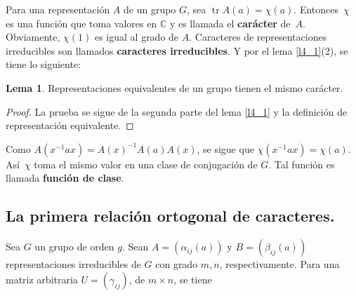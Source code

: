 \documentclass[12pt]{book}
\DeclareMathOperator{\tr}{tr}
\theoremstyle{definition}
\newtheorem{lemma}[theorem]{Lema}
\newcounter{in}
\newcounter{ini}
\begin{document}
Para una representación $A$ de un grupo $G$, sea $\tr
A(a)=\chi(a)$. Entonces~$\chi$ es una función que toma valores en
$\mathbb{C}$ y es llamada el \textbf{carácter} de~$A$. Obviamente,
$\chi(1)$ es igual al grado de $A$. Caracteres de representaciones
irreducibles son llamados \textbf{caracteres irreducibles}. Y por el
lema \ref{l4_1}(2), se tiene lo siguiente:

\begin{lemma}
  \label{l4_2}
  Representaciones equivalentes de un grupo tienen el mismo carácter.
\end{lemma}
\begin{proof}
  La prueba se sigue de la segunda parte del lema \ref{l4_1} y la
  definición de representación equivalente.
\end{proof}
Como $A(x^{-1}ax)=A(x)^{-1}A(a)A(x)$, se sigue que
$ \chi(x^{-1}ax)=\chi(a)$. Así~$\chi$ toma el mismo valor en una clase
de conjugación de $G$. Tal función es llamada \textbf{función de clase}.

\subsection{La primera relación ortogonal de caracteres.}
\label{subsec:roc1}
Sea $G$ un grupo de orden $g$. Sean $A=(\alpha_{ij}(a))$ y
$B=(\beta_{ij}(a))$ representaciones irreducibles de $G$ con grado
$m,n$, respectivamente. Para una matriz arbitraria $U=(\gamma_{ij})$,
de $m \times n$, se tiene
\end{document}
